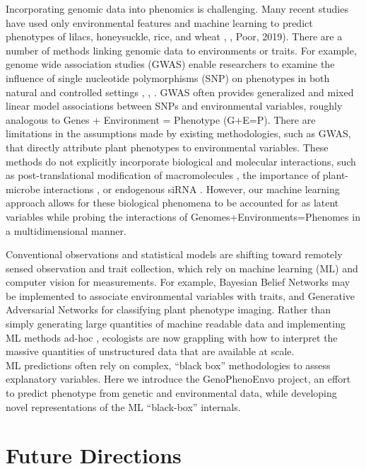 \documentclass[11pt,]{article}
\begin{document}
Incorporating genomic data into phenomics is challenging. Many recent
studies have used only environmental features and machine learning to
predict phenotypes of lilacs, honeysuckle, rice, and wheat
\citet{ALDERMAN20171}, \citet{nissanka2015calibration}, Poor, 2019).
There are a number of methods linking genomic data to environments or
traits. For example, genome wide association studies (GWAS) enable
researchers to examine the influence of single nucleotide polymorphisms
(SNP) on phenotypes in both natural and controlled settings
\citet{beyer2019loci}, \citet{schlappi2017assessment},
\citet{spindel2016genome}. GWAS often provides generalized and mixed
linear model associations between SNPs and environmental variables,
roughly analogous to Genes + Environment = Phenotype (G+E=P). There are
limitations in the assumptions made by existing methodologies, such as
GWAS, that directly attribute plant phenotypes to environmental
variables. These methods do not explicitly incorporate biological and
molecular interactions, such as post-translational modification of
macromolecules \citet{running2014role}, the importance of plant-microbe
interactions \citet{oyserman2019extracting}, or endogenous siRNA
\citet{katiyar2006pathogen}. However, our machine learning approach
allows for these biological phenomena to be accounted for as latent
variables while probing the interactions of
Genomes+Environments=Phenomes in a multidimensional manner.

Conventional observations and statistical models are shifting toward
remotely sensed observation and trait collection, which rely on machine
learning (ML) and computer vision for measurements. For example,
Bayesian Belief Networks \citet{cooper1990computational} may be
implemented to associate environmental variables with traits, and
Generative Adversarial Networks \citet{radford2015unsupervised} for
classifying plant phenotype imaging. Rather than simply generating large
quantities of machine readable data \citet{hampton2013big} and
implementing ML methods ad-hoc \citet{pichler2020machine}, ecologists
are now grappling with how to interpret the massive quantities of
unstructured data that are available at scale.\\
ML predictions often rely on complex, ``black box'' methodologies to
assess explanatory variables. Here we introduce the GenoPhenoEnvo
project, an effort to predict phenotype from genetic and environmental
data, while developing novel representations of the ML ``black-box''
internals.

\hypertarget{future-directions}{%
\section{Future Directions}\label{future-directions}}
\end{document}
